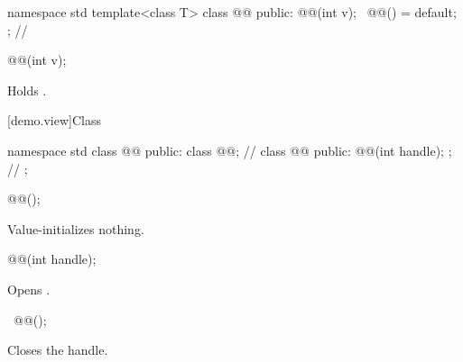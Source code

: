 \begin{codeblock}
namespace std {
  template<class T>
  class @@ {
  public:
    @@(int v);
    ~@@() = default;
  }; // \expos
}
\end{codeblock}

%
\begin{itemdecl}
@@(int v);
\end{itemdecl}

\begin{itemdescr}
\pnum
\effects
Holds .
\end{itemdescr}

[demo.view]{Class }

\begin{codeblock}
namespace std {
  class @@ {
  public:
    class @@; // \expos
    class @@ {
    public:
      @@(int handle);
    }; // \expos
  };
}
\end{codeblock}

%
\begin{itemdecl}
@@();
\end{itemdecl}

\begin{itemdescr}
\pnum
\effects
Value-initializes nothing.
\end{itemdescr}

%
\begin{itemdecl}
@@(int handle);
\end{itemdecl}

\begin{itemdescr}
\pnum
\effects
Opens .
\end{itemdescr}

%
\begin{itemdecl}
~@@();
\end{itemdecl}

\begin{itemdescr}
\pnum
\effects
Closes the handle.
\end{itemdescr}

